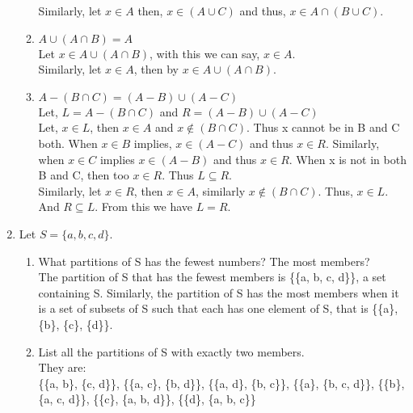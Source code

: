 \documentclass[a4paper,12pt]{article}
\begin{document}
\begin{enumerate}
\begin{enumerate}
            Similarly, let $x \in A$ then, $x \in (A \cup C)$ and thus, $x \in A\cap (B \cup C)$.
        \item
            $A \cup (A \cap B) = A$ \\
            Let $x \in A \cup (A \cap B)$, with this we can say, $x \in A$. \\
            Similarly, let $x \in A$, then by $x \in A \cup (A \cap B) $.
            \pagebreak
        \item
            $A - (B \cap C) = (A - B)\cup (A - C)$\\
            Let, $L = A -(B \cap C)$ and $R = (A - B) \cup (A - C)$\\ 
            Let, $x \in L$, then $x \in A$ and $x \not\in (B \cap C)$. Thus x cannot be in B and C both.
            When $x \in B$ implies, $x \in (A - C)$ and thus $x \in R$. Similarly, when $x \in C$ implies $ x \in (A - B)$ and thus $x \in R$.
            When x is not in both B and C, then too $x \in R$. Thus $L \subseteq R$.\\
            Similarly, let $x \in R$, then $x \in A$, similarly $x \not\in (B \cap C)$. Thus, $x \in L$. And $R \subseteq L$.
            From this we have $L = R$.
    \end{enumerate}
\item
            Let $S = \{a, b, c, d\}.$
            \begin{enumerate}
                \item
                    What partitions of S has the fewest numbers? The most members? \\
                    The partition of S that has the fewest members is \{\{a, b, c, d\}\}, a set containing S. Similarly, the partition of S has the most members when it is a set of subsets of S such that each has one element of S, that is \{\{a\}, \{b\}, \{c\}, \{d\}\}.
                \item
                    List all the partitions of S with exactly two members. \\
                    They are: \\
                        \{\{a, b\}, \{c, d\}\}, \{\{a, c\}, \{b, d\}\}, \{\{a, d\}, \{b, c\}\}, \{\{a\}, \{b, c, d\}\}, \{\{b\}, \{a, c, d\}\}, \{\{c\}, \{a, b, d\}\}, \{\{d\}, \{a, b, c\}\}
            \end{enumerate}
\end{enumerate}
\end{document}
